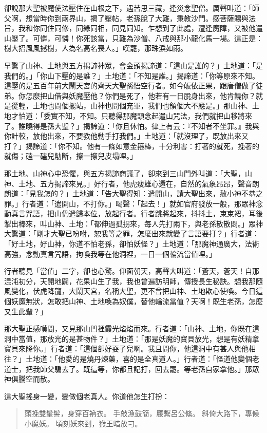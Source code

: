 卻說那大聖被魔使法壓住在山根之下，遇苦思三藏，逢災念聖僧。厲聲叫道：「師父啊，想當時你到兩界山，揭了壓帖，老孫脫了大難，秉教沙門。感菩薩賜與法旨，我和你同住同修，同緣同相，同見同知。乍想到了此處，遭逢魔障，又被他遣山壓了。可憐，可憐！你死該當，只難為沙僧、八戒與那小龍化馬一場。這正是：樹大招風風撼樹，人為名高名喪人。」嘆罷，那珠淚如雨。

早驚了山神、土地與五方揭諦神眾，會金頭揭諦道：「這山是誰的？」土地道：「是我們的。」「你山下壓的是誰？」土地道：「不知是誰。」揭諦道：「你等原來不知。這壓的是五百年前大鬧天宮的齊天大聖孫悟空行者。如今皈依正果，跟唐僧做了徒弟。你怎麼把山借與妖魔壓他？你們是死了，他若有一日脫身出來，他肯饒你？就是從輕，土地也問個擺站，山神也問個充軍，我們也領個大不應是。」那山神、土地才怕道：「委實不知，不知。只聽得那魔頭念起遣山咒法，我們就把山移將來了。誰曉得是孫大聖？」揭諦道：「你且休怕。律上有云：『不知者不坐罪。』我與你計較，放他出來，不要教他動手打我們。」土地道：「就沒理了，既放出來又打？」揭諦道：「你不知。他有一條如意金箍棒，十分利害：打著的就死，挽著的就傷；磕一磕兒觔斷，擦一擦兒皮塌哩。」

那土地、山神心中恐懼，與五方揭諦商議了，卻來到三山門外叫道：「大聖，山神、土地、五方揭諦來見。」好行者，他虎瘦雄心還在，自然的氣象昂昂，聲音朗朗道：「見我怎的？」土地道：「告大聖得知：遣開山，請大聖出來，赦小神不恭之罪。」行者道：「遣開山，不打你。」喝聲：「起去！」就如官府發放一般，那眾神念動真言咒語，把山仍遣歸本位，放起行者。行者跳將起來，抖抖土，束束裙，耳後掣出棒來，叫山神、土地：「都伸過孤拐來，每人先打兩下，與老孫散散悶。」眾神大驚道：「剛才大聖已吩咐，恕我等之罪，怎麼出來就變了言語要打？」行者道：「好土地，好山神，你道不怕老孫，卻怕妖怪？」土地道：「那魔神通廣大，法術高強，念動真言咒語，拘喚我等在他洞裡，一日一個輪流當值哩。」

行者聽見「當值」二字，卻也心驚。仰面朝天，高聲大叫道：「蒼天，蒼天！自那混沌初分，天開地闢，花果山生了我，我也曾遍訪明師，傳授長生秘訣。想我那隨風變化，伏虎降龍，大鬧天宮，名稱大聖，更不曾把山神、土地欺心使喚。今日這個妖魔無狀，怎敢把山神、土地喚為奴僕，替他輪流當值？天啊！既生老孫，怎麼又生此輩？」

那大聖正感嘆間，又見那山凹裡霞光焰焰而來。行者道：「山神、土地，你既在這洞中當值，那放光的是甚物件？」土地道：「那是妖魔的寶貝放光，想是有妖精拿寶貝來降你。」行者道：「這個卻好耍子兒啊。我且問你，他這洞中有甚人與他相往？」土地道：「他愛的是燒丹煉藥，喜的是全真道人。」行者道：「怪道他變個老道士，把我師父騙去了。既這等，你都且記打，回去罷。等老孫自家拿他。」那眾神俱騰空而散。

這大聖搖身一變，變做個老真人。你道他怎生打扮：
\begin{quote}
頭挽雙髽髻，身穿百衲衣。
手敲漁鼓簡，腰繫呂公絛。
斜倚大路下，專候小魔妖。
頃刻妖來到，猴王暗放刁。
\end{quote}

